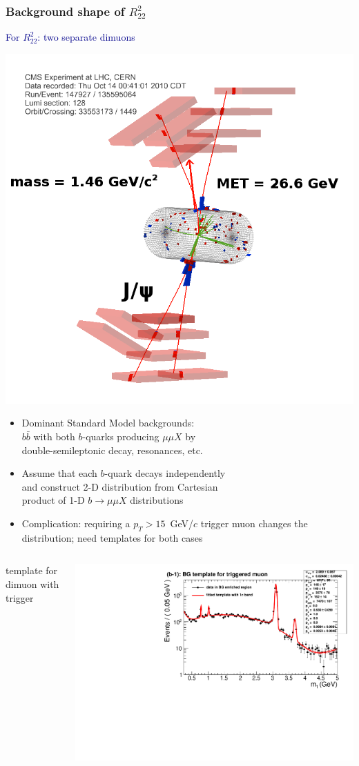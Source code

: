\documentclass[compress]{beamer}
\begin{document}
\begin{frame}
\frametitle{Background shape of $R^2_{22}$}

\textcolor{darkblue}{For $R^2_{22}$: two separate dimuons}

\vspace{-0.5 cm}
\hfill \mbox{\includegraphics[height=3.5 cm]{dimudimu_control_eventdisplay.png}\hspace{-0.75 cm}}

\vspace{-3.2 cm}
\begin{itemize}
\item Dominant Standard Model backgrounds: \\ $b\bar{b}$ with both
  $b$-quarks producing $\mu\mu X$ by \\ double-semileptonic decay,
  resonances, etc.
\item Assume that each $b$-quark decays independently \\ and construct
  2-D distribution from Cartesian \\ product of 1-D $b\to\mu\mu X$ distributions
\item Complication: requiring a $p_T > 15$~GeV/$c$ trigger muon
  changes the distribution; need templates for both cases
\end{itemize}

\begin{columns}
\centering template for dimuon with trigger

\includegraphics[width=\linewidth]{template__bg_sh_b1t__m_1_log.pdf}


\end{columns}
\end{frame}
\end{document}
